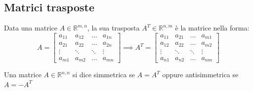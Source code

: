 \documentclass{article}
\begin{document}
\subsection{Matrici trasposte} \label{subsec:mattranspose}
    Data una matrice $A \in \mathbb{R}^{m, n}$, la sua trasposta $A^{T} \in \mathbb{R}^{n, m}$ è la matrice nella forma:
    \[
        A = 
        \begin{bmatrix}
            a_{11} & a_{12} & ... & a_{1n} \\
            a_{21} & a_{22} & ... & a_{2n} \\
            \vdots & \ddots & \ddots & \vdots \\
            a_{m1} & a_{m2} & ... & a_{mn} 
        \end{bmatrix} 
        \implies
        A^{T} = 
        \begin{bmatrix}
            a_{11} & a_{21} & ... & a_{m1} \\
            a_{12} & a_{22} & ... & a_{m2} \\
            \vdots & \ddots & \ddots & \vdots \\
            a_{n1} & a_{n2} & ... & a_{nm} 
        \end{bmatrix} 
    \]


    Una matrice $A \in \mathbb{R}^{n, n}$ si dice simmetrica se $A = A^{T}$ oppure antisimmetrica se $A = -A^{T}$
\end{document}
